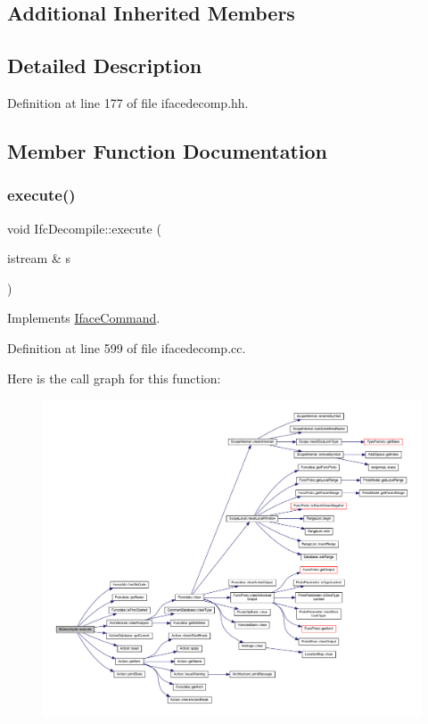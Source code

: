 \subsection*{Additional Inherited Members}


\subsection{Detailed Description}


Definition at line 177 of file ifacedecomp.\+hh.



\subsection{Member Function Documentation}
\mbox{\label{class_ifc_decompile_acf3a1c4ebd4069695d56d89c2babcf28}} 
\subsubsection{\texorpdfstring{execute()}{execute()}}
{\footnotesize\ttfamily void Ifc\+Decompile\+::execute (\begin{DoxyParamCaption}\item[{istream \&}]{s }\end{DoxyParamCaption})\hspace{0.3cm}{\ttfamily [virtual]}}



Implements \mbox{\hyperlink{class_iface_command_af10e29cee2c8e419de6efe9e680ad201}{Iface\+Command}}.



Definition at line 599 of file ifacedecomp.\+cc.

Here is the call graph for this function\+:
\nopagebreak
\begin{figure}[H]
\begin{center}
\leavevmode
\includegraphics[width=350pt]{class_ifc_decompile_acf3a1c4ebd4069695d56d89c2babcf28_cgraph}
\end{center}
\end{figure}


